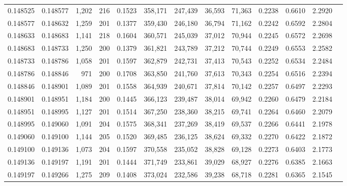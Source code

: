 \begin{tabular}{rrrrrrrrrrrrr}
0.148525 & 0.148577 & 1,202 & 216 &                                     0.1523 & 358,171 & 247,439 &  36,593 &  71,363 & 0.2238 & 0.6610 & 2.2920 \\
0.148577 & 0.148632 & 1,259 & 201 &                                     0.1377 & 359,430 & 246,180 &  36,794 &  71,162 & 0.2242 & 0.6592 & 2.2804 \\
0.148633 & 0.148683 & 1,141 & 218 &                                     0.1604 & 360,571 & 245,039 &  37,012 &  70,944 & 0.2245 & 0.6572 & 2.2698 \\
0.148683 & 0.148733 & 1,250 & 200 &                                     0.1379 & 361,821 & 243,789 &  37,212 &  70,744 & 0.2249 & 0.6553 & 2.2582 \\
0.148733 & 0.148786 & 1,058 & 201 &                                     0.1597 & 362,879 & 242,731 &  37,413 &  70,543 & 0.2252 & 0.6534 & 2.2484 \\
0.148786 & 0.148846 &   971 & 200 &                                     0.1708 & 363,850 & 241,760 &  37,613 &  70,343 & 0.2254 & 0.6516 & 2.2394 \\
0.148846 & 0.148901 & 1,089 & 201 &                                     0.1558 & 364,939 & 240,671 &  37,814 &  70,142 & 0.2257 & 0.6497 & 2.2293 \\
0.148901 & 0.148951 & 1,184 & 200 &                                     0.1445 & 366,123 & 239,487 &  38,014 &  69,942 & 0.2260 & 0.6479 & 2.2184 \\
0.148951 & 0.148995 & 1,127 & 201 &                                     0.1514 & 367,250 & 238,360 &  38,215 &  69,741 & 0.2264 & 0.6460 & 2.2079 \\
0.148995 & 0.149060 & 1,091 & 204 &                                     0.1575 & 368,341 & 237,269 &  38,419 &  69,537 & 0.2266 & 0.6441 & 2.1978 \\
0.149060 & 0.149100 & 1,144 & 205 &                                     0.1520 & 369,485 & 236,125 &  38,624 &  69,332 & 0.2270 & 0.6422 & 2.1872 \\
0.149100 & 0.149136 & 1,073 & 204 &                                     0.1597 & 370,558 & 235,052 &  38,828 &  69,128 & 0.2273 & 0.6403 & 2.1773 \\
0.149136 & 0.149197 & 1,191 & 201 &                                     0.1444 & 371,749 & 233,861 &  39,029 &  68,927 & 0.2276 & 0.6385 & 2.1663 \\
0.149197 & 0.149266 & 1,275 & 209 &                                     0.1408 & 373,024 & 232,586 &  39,238 &  68,718 & 0.2281 & 0.6365 & 2.1545 \\

\end{tabular}

